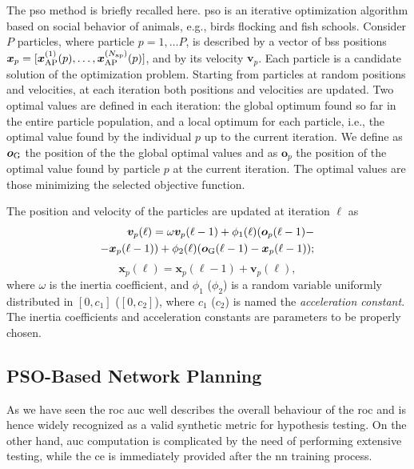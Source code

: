 \documentclass[conference,final]{IEEEtran}
\begin{document}
The \ac{pso} method is briefly recalled here. \ac{pso} is an iterative optimization algorithm based on social behavior of animals, e.g., birds flocking and fish schools. Consider $P$ particles, where  particle $p=1, \ldots P$, is described by a vector of \acp{bs} positions $\bm{x}_p = [\bm{x}_{\rm AP}^{(1)}(p),\ldots, \bm{x}_{\rm AP}^{(N_{\rm ap})}(p)]$, and by its velocity $\bm{v}_p$.  Each particle is a candidate solution of the optimization problem. Starting from particles at random positions and velocities, at each iteration both  positions  and  velocities   are updated. Two optimal values are defined in each iteration: the global optimum found so far in the entire particle population, and a local optimum for each particle, i.e., the optimal value found by the individual $p$ up to the current iteration. We define as $\bm{o}_{\rm G}$ the position of the the global optimal values and as $\bm{o}_p$ the position of the optimal value found by particle $p$ at the current iteration. The optimal values are those minimizing the selected objective function.

The position and velocity of the particles are updated at iteration $\ell$ as \cite{Kennedy-11}
   \begin{equation}\label{eq: v up}
\begin{split}
  \bm{v}_p(\ell) = \omega \bm{v}_p(\ell-1)+\phi_1(\ell)(\bm{o}_p(\ell-1)-\\
  -\bm{x}_p(\ell-1))+\phi_2(\ell)(\bm{o}_{\rm G}(\ell-1)-\bm{x}_p(\ell-1));
  \end{split}
  \end{equation}
  \begin{equation}\label{eq: p up}
  \bm{x}_p(\ell) = \bm{x}_p(\ell-1) + \bm{v}_p(\ell),
 \end{equation}
where $\omega$ is the inertia coefficient, and $\phi_1$ ($\phi_2$) is a random variable uniformly distributed in $[0,c_1]$ ($[0,c_2]$), where $c_1$ ($c_2$) is named the {\it acceleration constant}. The inertia coefficients and acceleration constants are  parameters to be properly chosen. 

\subsection{PSO-Based Network Planning}

As we have seen the \ac{roc} \ac{auc} well describes the overall behaviour of the \ac{roc} and is hence widely recognized as a valid synthetic metric for hypothesis testing. On the other hand, \ac{auc} computation  is complicated by the need of performing extensive testing, while the \ac{ce} is immediately provided after the \ac{nn} training process. 
\end{document}

